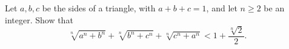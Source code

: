 Let $a,b,c$ be the sides of a triangle, with $a+b+c=1$, and let $n\ge 2$ be an integer. Show that
\[ \sqrt[n]{a^n+b^n}+\sqrt[n]{b^n+c^n}+\sqrt[n]{c^n+a^n}<1+\frac{\sqrt[n]{2}}{2}. \]